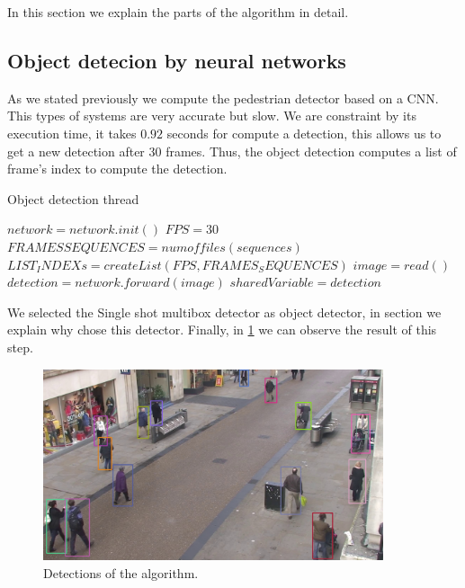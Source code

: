 In this section we explain the parts of the algorithm in detail.

\subsection{Object detecion by neural networks}



As we stated previously we compute the pedestrian detector based on a CNN. This types of systems are very accurate but slow. We are constraint by its execution time, it takes $0.92$ seconds for compute a detection, this allows us to get a new detection after $30$ frames. Thus,  the object detection computes a list of frame's index to compute the detection.



\begin{algorithm}
\caption{Object detection thread}\label{euclid}
\begin{algorithmic}[1]
\State $network = network.init()$
\State $FPS = 30$
\State $FRAMES SEQUENCES = num of files(sequences)$
\State $LIST_INDEXs = createList(FPS,FRAMES_SEQUENCES)$
\State $image = read()$
\State $detection = network.forward(image)$
\State $sharedVariable = detection$
\EndFor
\EndProcedure
\end{algorithmic}
\end{algorithm}

We selected the Single shot multibox detector as object detector, in section we explain why chose this detector. Finally, in \ref{objectDetector1} we can observe the result of this step.


\begin{figure}[H]
\centering         
\includegraphics[width=10cm]{intro/deteccions.jpg}
\caption{Detections of the algorithm.} \label{objectDetector1}
\end{figure}


